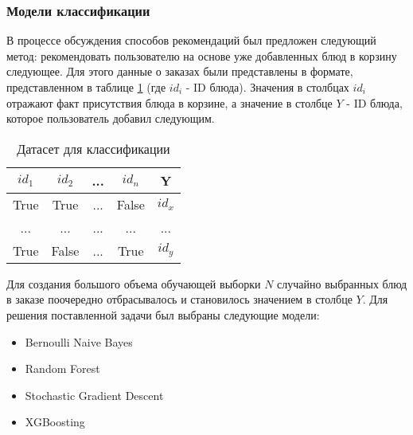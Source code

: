 \subsubsection{Модели классификации}
В процессе обсуждения способов рекомендаций был предложен следующий метод: рекомендовать
пользователю на основе уже добавленных блюд в корзину следующее. Для этого данные о заказах были
представлены в формате, представленном в таблице \ref{table:1} (где $id_i$ - ID блюда).
Значения в столбцах $id_i$ отражают факт присутствия блюда в корзине, а значение в
столбце $Y$ - ID блюда, которое пользователь добавил следующим.
\begin{table}[H]
  \centering
  \begin{tabular} { | c | c | c | c | c | }
  \hline
  $id_1$ & $id_2$ & ... & $id_n$ & Y \\
  \hline
  True  & True  & ... & False & $id_x$ \\
  \hline
  ...  & ...  & ... & ... & ... \\
  \hline
  True  & False  & ... & True & $id_y$ \\
  \hline
  \end{tabular}
  \caption{Датасет для классификации}
  \label{table:1}
\end{table}
Для создания большого объема обучающей выборки $N$ случайно выбранных блюд в заказе
поочередно отбрасывалось и становилось значением в столбце $Y$. Для решения поставленной
задачи был выбраны следующие модели:
\begin{itemize}
  \item Bernoulli Naive Bayes \cite{BernoulliNB}
  \item Random Forest \cite{RandomForest}
  \item Stochastic Gradient Descent \cite{SGD}
  \item XGBoosting \cite{XGBoosting}
\end{itemize}
